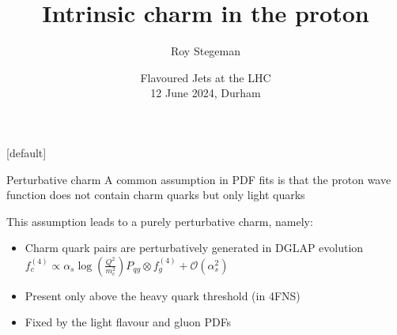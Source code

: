 \documentclass[aspectratio=43, 8pt,t]{beamer}
\title{Intrinsic charm in the proton}
\date{Flavoured Jets at the LHC  \\[0.1cm] 12 June 2024, Durham}
\author{Roy Stegeman}
\institute{\small The University of Edinburgh}
\begin{document}
{
\begin{frame}
  \titlepage
\end{frame}
}

[default]



\newcommand{\nn}{\vspace*{1em}}











\begin{frame}{Perturbative charm}
  A common assumption in PDF fits is that the proton wave function does not contain charm quarks but only light quarks

  \vspace*{1em}
  This assumption leads to a purely perturbative charm, namely:
  \begin{itemize}
    \item Charm quark pairs are perturbatively generated in DGLAP evolution\\
    $f_c^{(4)}\propto \alpha_s \log\left(\frac{Q^2}{m_c^2}\right)P_{qg} \otimes f_g^{(4)} + \mathcal{O}(\alpha_s^2)$

    \item Present only above the heavy quark threshold (in 4FNS)

    \item Fixed by the light flavour and gluon PDFs
  \end{itemize}

  \vspace*{1em}
\end{frame}
\end{document}
